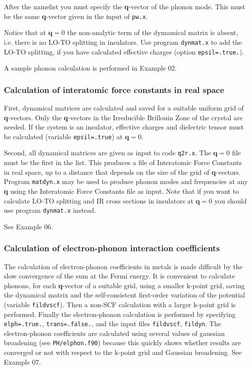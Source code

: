 \documentclass[12pt,a4paper]{article}
\begin{document}
After the namelist you must specify the \textbf{q}-vector of the
phonon mode.
This must be the same \textbf{q}-vector given in the input of
\texttt{pw.x}.

Notice that at $\mathbf{q}=0$ the non-analytic term of the
dymamical matrix is absent, i.e. there is no LO-TO splitting
in insulators. Use program \texttt{dynmat.x} to add the 
LO-TO splitting, if you have calculated effective charges
(option \texttt{epsil=.true.}).

A sample phonon calculation is performed in Example 02.

\subsubsection{Calculation of interatomic force constants in real
space}

First, dynamical matrices are calculated and saved for a suitable
uniform grid of \textbf{q}-vectors.
Only the \textbf{q}-vectors in the Irreducible Brillouin Zone of the
crystal are needed.
If the system is an insulator, effective charges and dielectric tensor
must be calculated (variable \texttt{epsil=.true}) at $\mathbf{q}=0$.

Second, all dynamical matrices are given as input to code
\texttt{q2r.x}.
The $\mathbf{q}=0$ file must be the first in the list.
This produces a file of Interatomic Force Constants in real space, up
to a distance that depends on the size of the grid of
\textbf{q}-vectors.
Program \texttt{matdyn.x} may be used to produce phonon modes and
frequencies at any \textbf{q} using the Interatomic Force Constants
file as input.
Note that if you want to calculate LO-TO splitting and IR cross
sections in insulators at $\mathbf{q}=0$ you should use program
\texttt{dynmat.x} instead.

See Example 06.

\subsubsection{Calculation of electron-phonon interaction
coefficients}

The calculation of electron-phonon coefficients in metals is made
difficult by the slow convergence of the sum at the Fermi energy.
It is convenient to calculate phonons, for each \textbf{q}-vector of a
suitable grid, using a smaller k-point grid, saving the dynamical
matrix and the self-consistent first-order variation of the potential
(variable \texttt{fildvscf}).
Then a non-SCF calculation with a larger k-point grid is performed.
Finally the electron-phonon calculation is performed by specifying
\texttt{elph=.true.}, \texttt{trans=.false.}, and the input files
\texttt{fildvscf}, \texttt{fildyn}.
The electron-phonon coefficients are calculated using several values
of gaussian broadening (see \texttt{PH/elphon.f90}) because this
quickly shows whether results are converged or not with respect to the
k-point grid and Gaussian broadening. See Example 07.
\end{document}
